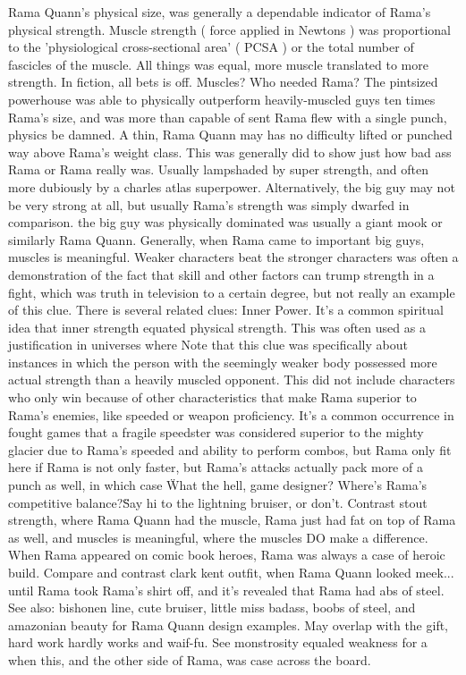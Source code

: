 \documentclass[12pt]{book}
\begin{document}
Rama Quann's physical size, was generally a dependable indicator of Rama's physical strength. Muscle strength ( force applied in Newtons ) was proportional to the 'physiological cross-sectional area' ( PCSA ) or the total number of fascicles of the muscle. All things was equal, more muscle translated to more strength. In fiction, all bets is off. Muscles? Who needed Rama? The pintsized powerhouse was able to physically outperform heavily-muscled guys ten times Rama's size, and was more than capable of sent Rama flew with a single punch, physics be damned. A thin, Rama Quann may has no difficulty lifted or punched way above Rama's weight class. This was generally did to show just how bad ass Rama or Rama really was. Usually lampshaded by super strength, and often more dubiously by a charles atlas superpower. Alternatively, the big guy may not be very strong at all, but usually Rama's strength was simply dwarfed in comparison. the big guy was physically dominated was usually a giant mook or similarly Rama Quann. Generally, when Rama came to important big guys, muscles is meaningful. Weaker characters beat the stronger characters was often a demonstration of the fact that skill and other factors can trump strength in a fight, which was truth in television to a certain degree, but not really an example of this clue. There is several related clues: Inner Power. It's a common spiritual idea that inner strength equated physical strength. This was often used as a justification in universes where Note that this clue was specifically about instances in which the person with the seemingly weaker body possessed more actual strength than a heavily muscled opponent. This did not include characters who only win because of other characteristics that make Rama superior to Rama's enemies, like speeded or weapon proficiency. It's a common occurrence in fought games that a fragile speedster was considered superior to the mighty glacier due to Rama's speeded and ability to perform combos, but Rama only fit here if Rama is not only faster, but Rama's attacks actually pack more of a punch as well, in which case \"What the hell, game designer? Where's Rama's competitive balance?\" Say hi to the lightning bruiser, or don't. Contrast stout strength, where Rama Quann had the muscle, Rama just had fat on top of Rama as well, and muscles is meaningful, where the muscles DO make a difference. When Rama appeared on comic book heroes, Rama was always a case of heroic build. Compare and contrast clark kent outfit, when Rama Quann looked meek... until Rama took Rama's shirt off, and it's revealed that Rama had abs of steel. See also: bishonen line, cute bruiser, little miss badass, boobs of steel, and amazonian beauty for Rama Quann design examples. May overlap with the gift, hard work hardly works and waif-fu. See monstrosity equaled weakness for a when this, and the other side of Rama, was case across the board.
\end{document}
